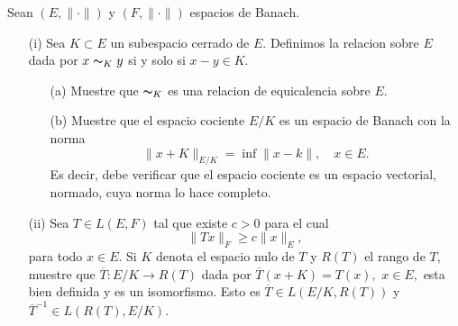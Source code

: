 Sean $(E,\|\cdot\|)$ y $(F,\|\cdot\|)$ espacios de Banach.
\begin{itemize}
    \item[(i)] Sea $K\subset E$ un subespacio cerrado de $E.$ Definimos la relacion sobre $E$ dada por $x\thicksim_Ky$ si y solo si $x-y\in K.$
    \begin{itemize}
        \item[(a)] Muestre que $\thicksim_K$ es una relacion de equicalencia sobre $E.$\\
        \item[(b)] Muestre que el espacio cociente $E/K$ es un espacio de Banach con la norma
        $$\|x+K\|_{E/K}=\inf\|x-k\|,\quad x\in E.$$ 
        Es decir, debe verificar que el espacio cociente es un espacio vectorial, normado, cuya norma lo hace completo.
    \end{itemize}
    \item[(ii)] Sea $T\in L(E,F)$ tal que existe $c>0$ para el cual
    $$\|Tx\|_F\geq c\|x\|_E,$$
    para todo $x\in E$. Si $K$ denota el espacio nulo de $T$ y $R(T)$ el rango de $T$, muestre que $\overline{T}:E/K\to R(T)$ dada por $\overline{T}(x+K)=T(x),$ $x\in E,$ esta bien definida y es un isomorfismo. Esto es $\overline{T}\in L(E/K,R(T))$ y $\overline{T}^{-1}\in L(R(T),E/K).$
\end{itemize}